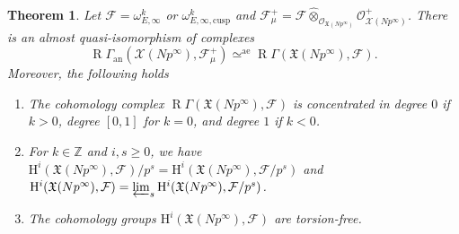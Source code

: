\documentclass[11pt]{article}
\newcommand{\rae}{\mathrm{ae}}
\newcommand{\an}{\mathrm{an}}
\newcommand{\cusp}{\mathrm{cusp}}
\newcommand{\wotimes}{\mathbin{\widehat\otimes}}
\numberwithin{equation}{section}
\newtheorem{theo}[prop]{Theorem}
\theoremstyle{definition}
\newcommand{\bb}[1]{\mathbb{#1}}
\newcommand{\n}[1]{\mathcal{#1}}
\newcommand{\f}[1]{\mathfrak{#1}}
\newcommand{\s}[1]{\mathscr{#1}}
\DeclareMathOperator{\R}{R}
\begin{document}
\begin{theo}
\label{Theo2Intro}
Let $\n{F}= \omega^k_{E,\infty}$ or $\omega^k_{E,\infty,\cusp}$ and $\n{F}_{\mu}^+=\n{F}\wotimes_{\s{O}_{\f{X}(Np^\infty)}} \s{O}^+_{\n{X}(Np^\infty)}$. There is an almost quasi-isomorphism of complexes
\[
\R \Gamma_{\an}(\n{X}(Np^\infty), \n{F}^+_{\mu}) \simeq^{\rae} \R \Gamma(\f{X}(Np^\infty), \n{F}).
\]
Moreover, the following holds
\begin{enumerate}

\item The cohomology complex $\R \Gamma(\f{X}(Np^\infty), \n{F})$ is concentrated in degree $0$ if $k>0$, degree $[0,1]$ for $k=0$, and degree $1$ if $k<0$.

\item For $k\in \bb{Z}$ and $i,s\geq 0$, we have $\mathrm{H}^i(\f{X}(Np^\infty), \n{F})/p^s = \mathrm{H}^i(\f{X}(Np^\infty), \n{F}/p^s)$ and $\mathrm{H}^i(\f{X}(Np^\infty), \n{F})= \varprojlim_s \mathrm{H}^i(\f{X}(Np^\infty), \n{F}/p^s)$.

\item The cohomology groups $\mathrm{H}^i(\f{X}(Np^\infty), \n{F})$ are torsion-free.
\end{enumerate}
\end{theo}
\end{document}
